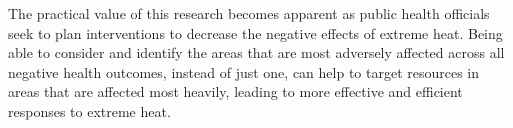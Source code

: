 \documentclass[final]{statsoc}
\begin{document}
The practical value of this research becomes apparent as public health officials seek to plan interventions to decrease the negative effects of extreme heat. Being able to consider and identify the areas that are most adversely affected across all negative health outcomes, instead of just one, can help to target resources in areas that are affected most heavily, leading to more effective and efficient responses to extreme heat.




\end{document}
